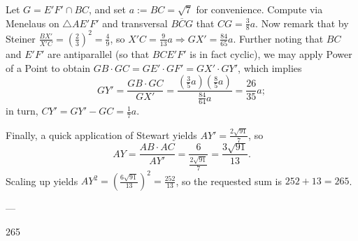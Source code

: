     Let $G = E'F'\cap BC$, and set $a := BC = \sqrt 7$ for convenience. Compute via Menelaus on $\triangle AE'F'$ and transversal $\overline{BCG}$ that $CG = \tfrac38a$. Now remark that by Steiner $\tfrac{BX'}{X'C} = (\tfrac 23)^2 = \tfrac 49$, so $X'C = \tfrac9{13}a\Rightarrow GX' = \tfrac{84}{65}a$. Further noting that $BC$ and $E'F'$ are antiparallel (so that $BCE'F'$ is in fact cyclic), we may apply Power of a Point to obtain $GB\cdot GC = GE'\cdot GF' = GX'\cdot GY'$, which implies
    \[
        GY' = \frac{GB\cdot GC}{GX'} = \frac{(\frac 35a)(\frac 85a)}{\frac{84}{64}a} = \frac{26}{35}a;
    \]in turn, $CY' = GY' - GC = \tfrac17a$.

    Finally, a quick application of Stewart yields $AY' = \tfrac{2\sqrt{91}}7$, so
    \[
        AY = \frac{AB\cdot AC}{AY'} = \frac{6}{\frac{2\sqrt{91}}7} = \frac{3\sqrt{91}}{13}.
    \]Scaling up yields $AY^2 = (\tfrac{6\sqrt{91}}{13})^2=\tfrac{252}{13}$, so the requested sum is $252+13=265$.


---

265

